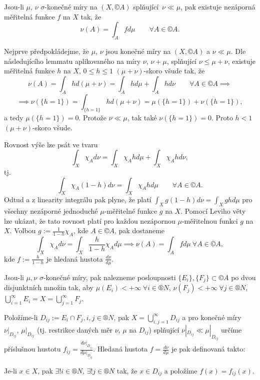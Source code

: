 \documentclass[12pt]{article}					%
\begin{document}
\begin{veta}
	Jsou-li $\mu$, $\nu$ $\sigma$-konečné míry na $(X, ©A)$ splňující $\nu \ll \mu$, pak existuje nezáporná měřitelná funkce $f$ na $X$ tak, že
	$$ \nu(A) = \int_A f d\mu \qquad \forall A \in ©A. $$

	\begin{dukazin}
		Nejprve předpokládejme, že $\mu$, $\nu$ jsou konečné míry na $(X, ©A)$ a $\nu \ll \mu$. Dle následujícího lemmatu aplikovaného na míry $\nu$, $\nu + \mu$, splňující $\nu ≤ \mu + \nu$, existuje měřitelná funkce $h$ na $X$, $0 ≤ h ≤ 1$ $(\mu + \nu)$-skoro všude tak, že
		$$ \nu(A) = \int_A h d(\mu + \nu) = \int_A h d\mu + \int_A h d\nu \qquad \forall A \in ©A \implies $$
		$$ \implies \nu(\{h = 1\}) = \int_{\{h=1\}} h d(\mu + \nu) = \mu(\{h = 1\}) + \nu(\{h = 1\}), $$
		a tedy $\mu(\{h = 1\}) = 0$. Protože $\nu \ll \mu$, tak také $\nu(\{h = 1\}) = 0$. Proto $h < 1$ $(\mu + \nu)$-skoro všude.

		Rovnost výše lze psát ve tvaru
		$$ \int_X \chi_A d\nu = \int_X \chi_A h d\mu + \int_X \chi_A h d\nu, $$
		tj.
		$$ \int_X \chi_A (1 - h) d\nu = \int_X \chi_A h d\mu \qquad \forall A \in ©A. $$
		Odtud a z linearity integrálu pak plyne, že platí $\int_X g (1 - h) d\nu = \int_X g h d\mu$ pro všechny nezáporné jednoduché $\mu$-měřitelné funkce $g$ na $X$. Pomocí Leviho věty lze ukázat, že tato rovnost platí pro každou nezápornou $\mu$-měřitelnou funkci $g$ na $X$. Volbou $g := \frac{1}{1 - h} \chi_A$, kde $A \in ©A$, pak dostaneme
		$$ \int_X \chi_A d\nu = \int_X \frac{h}{1 - h} \chi_A d\mu \implies \nu(A) = \int_A f d\mu\ \forall A \in ©A, $$
		kde $f := \frac{h}{1 - h}$ je hledaná hustota $\frac{d\nu}{d\mu}$.

		Jsou-li $\mu, \nu$ $\sigma$-konečné míry, pak nalezneme posloupnosti $\{E_i\}, \{F_j\} \subset ©A$ po dvou disjunktních množin tak, aby $\mu(E_i) < +∞\ \forall i \in ®N$, $\nu(F_j) < +∞\ \forall j \in ®N$, $\bigcup_{i=1}^∞ E_i = X = \bigcup_{j=1}^∞ F_j$.

		Položíme-li $D_{ij} := E_i \cap F_j, i, j \in ®N$, pak $X = \bigcup_{i,j=1}^∞ D_{ij}$ a pro konečné míry $\nu|_{D_{ij}}$, $\mu|_{D_{ij}}$ (tj. restrikce daných měr $\nu$, $\mu$ na $D_{ij}$) splňující $\nu|_{D_{ij}} \ll \mu|_{D_{ij}}$ určíme příslušnou hustotu $f_{ij} = \frac{d\nu|_{D_{ij}}}{d\mu|_{D_{ij}}}$. Hledaná hustota $f = \frac{d\nu}{d\mu}$ je pak definovaná takto:

		Je-li $x \in X$, pak $\exists!i \in ®N$, $\exists!j \in ®N$ tak, že $x \in D_{ij}$ a položíme $f(x) = f_{ij}(x)$.
	\end{dukazin}
\end{veta}
\end{document}
